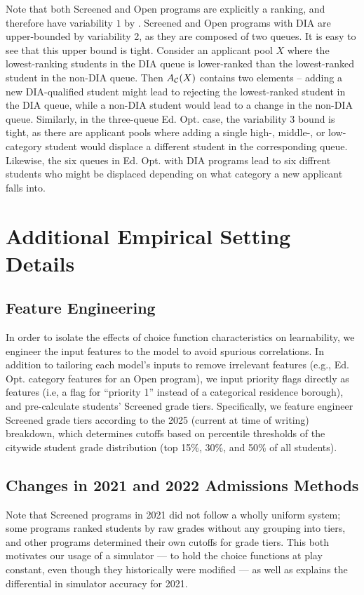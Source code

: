 Note that both Screened and Open programs are explicitly a ranking, and therefore have variability $1$ by  .
Screened and Open programs with DIA are upper-bounded by variability 2, as they are composed of two queues. It is easy to see that this upper bound is tight. Consider an applicant pool $X$ where the lowest-ranking students in the DIA queue is lower-ranked than the lowest-ranked student in the non-DIA queue. Then $A_{\mathcal{C}}(X)$ contains two elements -- adding a new DIA-qualified student might lead to rejecting the lowest-ranked student in the DIA queue, while a non-DIA student would lead to a change in the non-DIA queue. Similarly, in the three-queue Ed. Opt. case, the variability $3$ bound is tight, as there are applicant pools where adding a single high-, middle-, or low-category student would displace a different student in the corresponding queue. Likewise, the six queues in Ed. Opt. with DIA programs lead to six diffrent students who might be displaced depending on what category a new applicant falls into.

\section{Additional Empirical Setting Details}
\subsection{Feature Engineering} \label{sec:feature-engineering-appendix}
In order to isolate the effects of choice function characteristics on learnability, we engineer the input features to the model to avoid spurious correlations. In addition to tailoring each model's inputs to remove irrelevant features (e.g., Ed. Opt. category features for an Open program), we input priority flags directly as features (i.e, a flag for ``priority 1'' instead of a categorical residence borough), and pre-calculate students' Screened grade tiers. Specifically, we feature engineer Screened grade tiers according to the 2025 (current at time of writing) breakdown, which determines cutoffs based on percentile thresholds of the citywide student grade distribution (top 15\%, 30\%, and 50\% of all students).

\subsection{Changes in 2021 and 2022 Admissions Methods}
Note that Screened programs in 2021 did not follow a wholly uniform system; some programs ranked students by raw grades without any grouping into tiers, and other programs determined their own cutoffs for grade tiers. This both motivates our usage of a simulator --- to hold the choice functions at play constant, even though they historically were modified --- as well as explains the differential in simulator accuracy for 2021.

